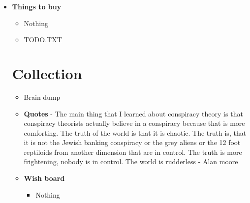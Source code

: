 \documentclass[a4paper]{article}
\begin{document}
	\begin{itemize}
		\item \textbf{Things to buy}
			\begin{itemize}
				\item Nothing
			\end{itemize}
	\begin{itemize}
		\item \href{https://github.com/todotxt/todo.txt}{TODO.TXT}
	\end{itemize}
\newpage
	\section{Collection}
	\begin{itemize}
		\item	Brain dump 
		\item \textbf{Quotes} - The main thing that I learned about conspiracy theory is that conspiracy theorists actually believe in a conspiracy because that is more comforting. The truth of the world is that it is chaotic. The truth is, that it is not the Jewish banking conspiracy or the grey aliens or the 12 foot reptiloids from another dimension that are in control. The truth is more frightening, nobody is in control. The world is rudderless - Alan moore
		\item \textbf{Wish board}
			\begin{itemize}
				\item Nothing
			\end{itemize}
	\end{itemize}

\end{itemize}
\end{document}

